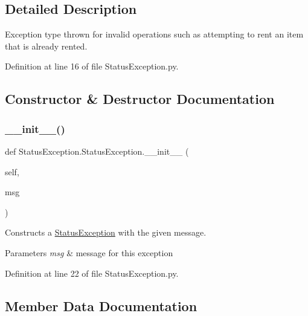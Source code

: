\subsection{Detailed Description}
Exception type thrown for invalid operations such as attempting to rent an item that is already rented. 

Definition at line 16 of file Status\+Exception.\+py.



\subsection{Constructor \& Destructor Documentation}
\mbox{\label{classStatusException_1_1StatusException_a2b3f98decbd77f5e59626b9b50b27a36}} 
\subsubsection{\texorpdfstring{\+\_\+\+\_\+init\+\_\+\+\_\+()}{\_\_init\_\_()}}
{\footnotesize\ttfamily def Status\+Exception.\+Status\+Exception.\+\_\+\+\_\+init\+\_\+\+\_\+ (\begin{DoxyParamCaption}\item[{}]{self,  }\item[{}]{msg }\end{DoxyParamCaption})}



Constructs a \hyperlink{classStatusException_1_1StatusException}{Status\+Exception} with the given message. 


\begin{DoxyParams}{Parameters}
{\em msg} & message for this exception \\
\hline
\end{DoxyParams}


Definition at line 22 of file Status\+Exception.\+py.



\subsection{Member Data Documentation}
\mbox{\label{classStatusException_1_1StatusException_a4f3ffa4a96ccf5ca673e9e800d2f4c56}} 
